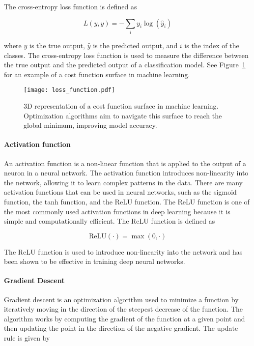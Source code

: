 The cross-entropy loss function is defined as 

$$
    L(y, \hat{y}) = -\sum_{i} y_i \log(\hat{y}_i)
$$

where $y$ is the true output, $\hat{y}$ is the predicted output, and $i$ is the index of the classes. The cross-entropy loss function is used to measure the difference between the true output and the predicted output of a classification model. See Figure~\ref{fig:loss_function} for an example of a cost function surface in machine learning.

\begin{figure}[H]
    \centering
    \texttt{[image: loss\_function.pdf]}
    \caption{3D representation of a cost function surface in machine learning. Optimization algorithms aim to navigate this surface to reach the global minimum, improving model accuracy.}
    \label{fig:loss_function}
\end{figure}

\paragraph{Activation function}
An activation function is a non-linear function that is applied to the output of a neuron in a neural network. The activation function introduces non-linearity into the network, allowing it to learn complex patterns in the data. There are many activation functions that can be used in neural networks, such as the sigmoid function, the tanh function, and the ReLU function. The ReLU function is one of the most commonly used activation functions in deep learning because it is simple and computationally efficient. The ReLU function is defined as

$$
    \textrm{ReLU}(\cdot)=\max(0,\cdot)
$$

The ReLU function is used to introduce non-linearity into the network and has been shown to be effective in training deep neural networks.


\paragraph{Gradient Descent}
Gradient descent is an optimization algorithm used to minimize a function by iteratively moving in the direction of the steepest decrease of the function. The algorithm works by computing the gradient of the function at a given point and then updating the point in the direction of the negative gradient. The update rule is given by

